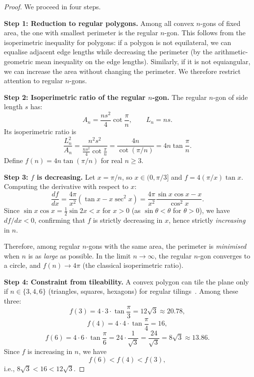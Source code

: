 \begin{proof}
We proceed in four steps.

\medskip\noindent\textbf{Step 1: Reduction to regular polygons.}
Among all convex \(n\)-gons of fixed area, the one with smallest perimeter
is the regular \(n\)-gon.  This follows from the isoperimetric inequality
for polygons: if a polygon is not equilateral, we can equalise adjacent
edge lengths while decreasing the perimeter (by the arithmetic-geometric
mean inequality on the edge lengths).  Similarly, if it is not equiangular,
we can increase the area without changing the perimeter.
We therefore restrict attention to regular \(n\)-gons.

\medskip\noindent\textbf{Step 2: Isoperimetric ratio of the regular \(n\)-gon.}
The regular \(n\)-gon of side length \(s\) has:
\[
  A_n = \frac{ns^2}{4}\cot\frac{\pi}{n}, \qquad
  L_n = ns.
\]
Its isoperimetric ratio is
\[
  \frac{L_n^2}{A_n} = \frac{n^2 s^2}{\frac{ns^2}{4}\cot\frac{\pi}{n}}
                    = \frac{4n}{\cot(\pi/n)} = 4n\tan\frac{\pi}{n}.
\]
Define \(f(n) = 4n\tan(\pi/n)\) for real \(n\ge 3\).

\medskip\noindent\textbf{Step 3: \(f\) is decreasing.}
Let \(x=\pi/n\), so \(x\in(0,\pi/3]\) and \(f = 4(\pi/x)\tan x\).
Computing the derivative with respect to \(x\):
\[
  \frac{df}{dx} = \frac{4\pi}{x^2}(\tan x - x\sec^2 x)
                = \frac{4\pi}{x^2}\frac{\sin x\cos x - x}{\cos^2 x}.
\]
Since \(\sin x\cos x = \frac{1}{2}\sin 2x < x\) for \(x>0\) (as
\(\sin\theta < \theta\) for \(\theta>0\)), we have \(df/dx < 0\),
confirming that \(f\) is strictly decreasing in \(x\), hence strictly
\emph{increasing} in \(n\).

Therefore, among regular \(n\)-gons with the same area, the perimeter
is \emph{minimised} when \(n\) is as \emph{large} as possible.
In the limit \(n\to\infty\), the regular \(n\)-gon converges to a circle,
and \(f(n)\to 4\pi\) (the classical isoperimetric ratio).

\medskip\noindent\textbf{Step 4: Constraint from tileability.}
A convex polygon can tile the plane only if \(n\in\{3,4,6\}\)
(triangles, squares, hexagons) for regular tilings~\cite{coxeter_intro_geometry}.
Among these three:
\[
  f(3) = 4\cdot 3\cdot\tan\frac{\pi}{3} = 12\sqrt{3} \approx 20.78,
\]
\[
  f(4) = 4\cdot 4\cdot\tan\frac{\pi}{4} = 16,
\]
\[
  f(6) = 4\cdot 6\cdot\tan\frac{\pi}{6} = 24\cdot\frac{1}{\sqrt{3}}
       = \frac{24}{\sqrt{3}} = 8\sqrt{3} \approx 13.86.
\]
Since \(f\) is increasing in \(n\), we have
\[
  f(6) < f(4) < f(3),
\]
i.e., \(8\sqrt{3} < 16 < 12\sqrt{3}\).


\end{proof}

